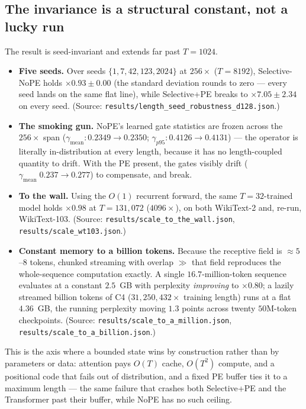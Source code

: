 \documentclass[11pt]{article}
\theoremstyle{definition}
\newcommand{\code}[1]{\texttt{#1}}
\begin{document}
\subsection{The invariance is a structural constant, not a lucky run}
The result is seed-invariant and extends far past $T{=}1024$.
\begin{itemize}
\sloppy
\item \textbf{Five seeds.} Over seeds $\{1,7,42,123,2024\}$ at $256\times$ ($T{=}8192$),
Selective-NoPE holds $\times0.93\pm0.00$ (the standard deviation rounds to zero --- every seed
lands on the same flat line), while Selective+PE breaks to $\times7.05\pm2.34$ on every seed.
(Source: \code{results/length\_seed\_robustness\_d128.json}.)
\item \textbf{The smoking gun.} NoPE's learned gate statistics are frozen across the $256\times$
span ($\gamma_\text{mean}: 0.2349\to0.2350$; $\gamma_{p95}: 0.4126\to0.4131$) --- the operator
is literally in-distribution at every length, because it has no length-coupled quantity to
drift. With the PE present, the gates visibly drift ($\gamma_\text{mean}\;0.237\to0.277$) to
compensate, and break.
\item \textbf{To the wall.} Using the $O(1)$ recurrent forward, the same $T{=}32$-trained model
holds $\times0.98$ at $T{=}131{,}072$ ($4096\times$), on both WikiText-2 and, re-run,
WikiText-103. (Source: \code{results/scale\_to\_the\_wall.json}, \code{results/scale\_wt103.json}.)
\item \textbf{Constant memory to a billion tokens.} Because the receptive field is
$\approx5$--$8$ tokens, chunked streaming with overlap $\gg$ that field reproduces the
whole-sequence computation exactly. A single $16.7$-million-token sequence evaluates at a
constant $2.5$~GB with perplexity \emph{improving} to $\times0.80$; a lazily streamed billion
tokens of C4 ($31{,}250{,}432\times$ training length) runs at a flat $4.36$~GB, the running
perplexity moving $1.3$ points across twenty $50$M-token checkpoints. (Source:
\code{results/scale\_to\_a\_million.json}, \code{results/scale\_to\_a\_billion.json}.)
\end{itemize}
This is the axis where a bounded state wins by construction rather than by parameters or data:
attention pays $O(T)$ cache, $O(T^2)$ compute, and a positional code that fails out of
distribution, and a fixed PE buffer ties it to a maximum length --- the same failure that
crashes both Selective+PE and the Transformer past their buffer, while NoPE has no such ceiling.
\end{document}
